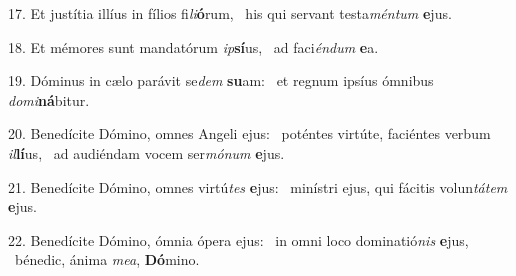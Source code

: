 17. Et justítia illíus in fílios fi\textit{li}\textbf{ó}rum, \ast\  his qui servant testa\textit{mén}\textit{tum} \textbf{e}jus.\

18. Et mémores sunt mandatórum \textit{ip}\textbf{sí}us, \ast\  ad faci\textit{én}\textit{dum} \textbf{e}a.\

19. Dóminus in cælo parávit se\textit{dem} \textbf{su}am: \ast\  et regnum ipsíus ómnibus \textit{do}\textit{mi}\textbf{ná}bitur.\

20. Benedícite Dómino, omnes Angeli ejus: \dag\  poténtes virtúte, faciéntes verbum \textit{il}\textbf{lí}us, \ast\  ad audiéndam vocem ser\textit{mó}\textit{num} \textbf{e}jus.\

21. Benedícite Dómino, omnes virtú\textit{tes} \textbf{e}jus: \ast\  minístri ejus, qui fácitis volun\textit{tá}\textit{tem} \textbf{e}jus.\

22. Benedícite Dómino, ómnia ópera ejus: \dag\  in omni loco dominatió\textit{nis} \textbf{e}jus, \ast\  bénedic, ánima \textit{me}\textit{a}, \textbf{Dó}mino.\

